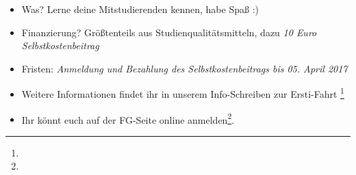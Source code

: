 \begin{itemize}
\begin{itemize}
		\item Was? Lerne deine Mitstudierenden kennen, habe Spaß :)
		\item Finanzierung? Größtenteils aus Studienqualitätsmitteln, dazu \emph{10 Euro Selbstkostenbeitrag}
		\item Fristen: \emph{Anmeldung und Bezahlung des Selbstkostenbeitrags bis 05. April 2017}
		\item Weitere Informationen findet ihr in unserem Info-Schreiben zur Ersti-Fahrt \footnote{}
		\item Ihr könnt euch auf der FG-Seite online anmelden\footnote{}.
	\end{itemize}
\end{itemize}